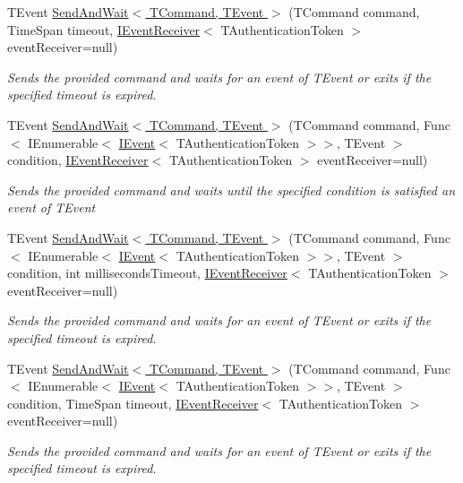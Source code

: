 \begin{DoxyCompactItemize}
T\+Event \hyperlink{classCqrs_1_1Akka_1_1Commands_1_1ConcurrentAkkaCommandSender_ad838e5f54cae4ff87d091feefc00d930}{Send\+And\+Wait$<$ T\+Command, T\+Event $>$} (T\+Command command, Time\+Span timeout, \hyperlink{interfaceCqrs_1_1Events_1_1IEventReceiver}{I\+Event\+Receiver}$<$ T\+Authentication\+Token $>$ event\+Receiver=null)
\begin{DoxyCompactList}\small\item\em Sends the provided {\itshape command}  and waits for an event of {\itshape T\+Event}  or exits if the specified timeout is expired. \end{DoxyCompactList}\item 
T\+Event \hyperlink{classCqrs_1_1Akka_1_1Commands_1_1ConcurrentAkkaCommandSender_a4fa4c2475a650e903b59013e939695f2}{Send\+And\+Wait$<$ T\+Command, T\+Event $>$} (T\+Command command, Func$<$ I\+Enumerable$<$ \hyperlink{interfaceCqrs_1_1Events_1_1IEvent}{I\+Event}$<$ T\+Authentication\+Token $>$$>$, T\+Event $>$ condition, \hyperlink{interfaceCqrs_1_1Events_1_1IEventReceiver}{I\+Event\+Receiver}$<$ T\+Authentication\+Token $>$ event\+Receiver=null)
\begin{DoxyCompactList}\small\item\em Sends the provided {\itshape command}  and waits until the specified condition is satisfied an event of {\itshape T\+Event}  \end{DoxyCompactList}\item 
T\+Event \hyperlink{classCqrs_1_1Akka_1_1Commands_1_1ConcurrentAkkaCommandSender_a17a0d4fa182f4288a5a6c48d6df1801b}{Send\+And\+Wait$<$ T\+Command, T\+Event $>$} (T\+Command command, Func$<$ I\+Enumerable$<$ \hyperlink{interfaceCqrs_1_1Events_1_1IEvent}{I\+Event}$<$ T\+Authentication\+Token $>$$>$, T\+Event $>$ condition, int milliseconds\+Timeout, \hyperlink{interfaceCqrs_1_1Events_1_1IEventReceiver}{I\+Event\+Receiver}$<$ T\+Authentication\+Token $>$ event\+Receiver=null)
\begin{DoxyCompactList}\small\item\em Sends the provided {\itshape command}  and waits for an event of {\itshape T\+Event}  or exits if the specified timeout is expired. \end{DoxyCompactList}\item 
T\+Event \hyperlink{classCqrs_1_1Akka_1_1Commands_1_1ConcurrentAkkaCommandSender_afda9034e20ed82cd3742f1489ebe1b3a}{Send\+And\+Wait$<$ T\+Command, T\+Event $>$} (T\+Command command, Func$<$ I\+Enumerable$<$ \hyperlink{interfaceCqrs_1_1Events_1_1IEvent}{I\+Event}$<$ T\+Authentication\+Token $>$$>$, T\+Event $>$ condition, Time\+Span timeout, \hyperlink{interfaceCqrs_1_1Events_1_1IEventReceiver}{I\+Event\+Receiver}$<$ T\+Authentication\+Token $>$ event\+Receiver=null)
\begin{DoxyCompactList}\small\item\em Sends the provided {\itshape command}  and waits for an event of {\itshape T\+Event}  or exits if the specified timeout is expired. \end{DoxyCompactList}\end{DoxyCompactItemize}
